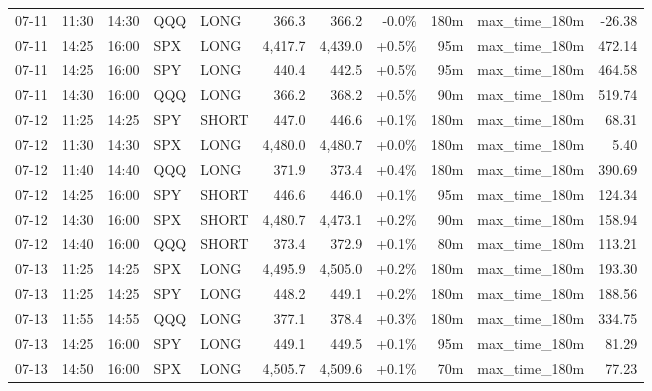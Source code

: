 \documentclass[11pt,a4paper,twoside]{article}
\begin{document}
\begin{center}
\begin{longtable}{>{\color{txtmain}}l l l l l r r r r >{\color{txtmain}}l r}
07-11 & 11:30 & 14:30 & QQQ & LONG & 366.3 & 366.2 & \textcolor{lossred}{-0.0\%} & 180m & max\_time\_180m & \textcolor{lossred}{-26.38} \\
07-11 & 14:25 & 16:00 & SPX & LONG & 4,417.7 & 4,439.0 & \textcolor{wingreen}{+0.5\%} & 95m & max\_time\_180m & \textcolor{wingreen}{472.14} \\
07-11 & 14:25 & 16:00 & SPY & LONG & 440.4 & 442.5 & \textcolor{wingreen}{+0.5\%} & 95m & max\_time\_180m & \textcolor{wingreen}{464.58} \\
07-11 & 14:30 & 16:00 & QQQ & LONG & 366.2 & 368.2 & \textcolor{wingreen}{+0.5\%} & 90m & max\_time\_180m & \textcolor{wingreen}{519.74} \\
07-12 & 11:25 & 14:25 & SPY & SHORT & 447.0 & 446.6 & \textcolor{wingreen}{+0.1\%} & 180m & max\_time\_180m & \textcolor{wingreen}{68.31} \\
07-12 & 11:30 & 14:30 & SPX & LONG & 4,480.0 & 4,480.7 & \textcolor{wingreen}{+0.0\%} & 180m & max\_time\_180m & \textcolor{wingreen}{5.40} \\
07-12 & 11:40 & 14:40 & QQQ & LONG & 371.9 & 373.4 & \textcolor{wingreen}{+0.4\%} & 180m & max\_time\_180m & \textcolor{wingreen}{390.69} \\
07-12 & 14:25 & 16:00 & SPY & SHORT & 446.6 & 446.0 & \textcolor{wingreen}{+0.1\%} & 95m & max\_time\_180m & \textcolor{wingreen}{124.34} \\
07-12 & 14:30 & 16:00 & SPX & SHORT & 4,480.7 & 4,473.1 & \textcolor{wingreen}{+0.2\%} & 90m & max\_time\_180m & \textcolor{wingreen}{158.94} \\
07-12 & 14:40 & 16:00 & QQQ & SHORT & 373.4 & 372.9 & \textcolor{wingreen}{+0.1\%} & 80m & max\_time\_180m & \textcolor{wingreen}{113.21} \\
07-13 & 11:25 & 14:25 & SPX & LONG & 4,495.9 & 4,505.0 & \textcolor{wingreen}{+0.2\%} & 180m & max\_time\_180m & \textcolor{wingreen}{193.30} \\
07-13 & 11:25 & 14:25 & SPY & LONG & 448.2 & 449.1 & \textcolor{wingreen}{+0.2\%} & 180m & max\_time\_180m & \textcolor{wingreen}{188.56} \\
07-13 & 11:55 & 14:55 & QQQ & LONG & 377.1 & 378.4 & \textcolor{wingreen}{+0.3\%} & 180m & max\_time\_180m & \textcolor{wingreen}{334.75} \\
07-13 & 14:25 & 16:00 & SPY & LONG & 449.1 & 449.5 & \textcolor{wingreen}{+0.1\%} & 95m & max\_time\_180m & \textcolor{wingreen}{81.29} \\
07-13 & 14:50 & 16:00 & SPX & LONG & 4,505.7 & 4,509.6 & \textcolor{wingreen}{+0.1\%} & 70m & max\_time\_180m & \textcolor{wingreen}{77.23} \\

\end{longtable}
\end{center}
\end{document}
